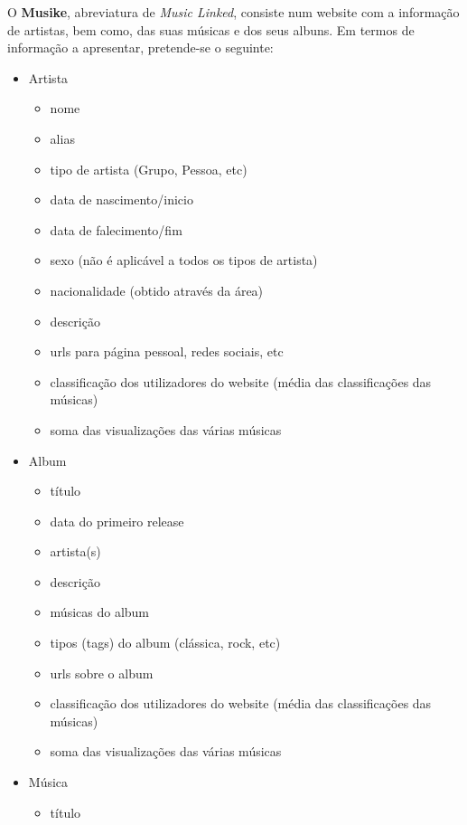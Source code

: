 \documentclass{article}
\begin{document}
O \textbf{Musike}, abreviatura de \textit{Music Linked}, consiste num website com a informação de artistas, bem como, das suas músicas e dos seus albuns. Em termos de informação a apresentar, pretende-se o seguinte:
\begin{itemize}
    \item Artista
        \begin{itemize}
            \item nome
            \item alias
            \item tipo de artista (Grupo, Pessoa, etc)
            \item data de nascimento/inicio
            \item data de falecimento/fim
            \item sexo (não é aplicável a todos os tipos de artista)
            \item nacionalidade (obtido através da área)
            \item descrição
            \item urls para página pessoal, redes sociais, etc
            \item classificação dos utilizadores do website (média das classificações das músicas)
            \item soma das visualizações das várias músicas
        \end{itemize}
    \item Album
        \begin{itemize}
            \item título
            \item data do primeiro release
            \item artista(s)
            \item descrição
            \item músicas do album
            \item tipos (tags) do album (clássica, rock, etc)
            \item urls sobre o album
            \item classificação dos utilizadores do website (média das classificações das músicas)
            \item soma das visualizações das várias músicas
        \end{itemize}
    \item Música
        \begin{itemize}
            \item título

\end{itemize}
\end{itemize}
\end{document}
